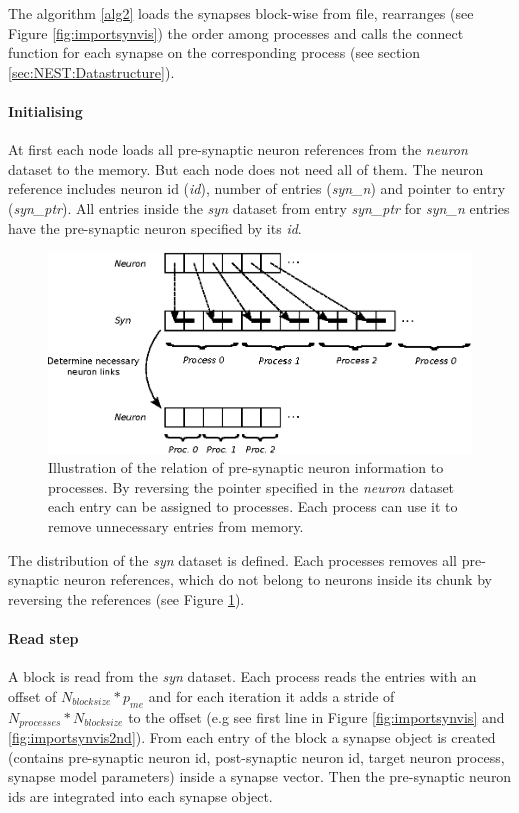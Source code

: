 The algorithm \ref{alg2} loads the synapses block-wise from file, rearranges (see Figure \ref{fig:importsynvis}) the order
among processes and calls the connect function for each synapse on the corresponding process (see section \ref{sec:NEST:Datastructure}).

\newpage
\paragraph{Initialising}
At first each node loads all pre-synaptic neuron references from the \emph{neuron} dataset to the memory.
But each node does not need all of them. 
The neuron reference includes neuron id (\emph{id}), number of entries  (\emph{syn\_n}) and pointer to entry (\emph{syn\_ptr}).
All entries inside the \emph{syn} dataset from  entry \emph{syn\_ptr} for \emph{syn\_n} entries have the pre-synaptic neuron specified by its \emph{id}.
\begin{figure}[ht!]
\centering
\includegraphics[scale=1.0]{pictures/NeuronLinksRemoving.eps}
\caption{Illustration of the relation of pre-synaptic neuron information to processes.
By reversing the pointer specified in the \emph{neuron} dataset
each entry can be assigned to processes.
Each process can use it to remove unnecessary entries from memory.
}
\label{fig:neuonlinksremoving}
\end{figure}
The distribution of the \emph{syn} dataset is defined.
Each processes removes all pre-synaptic neuron references, which do not belong to
neurons inside its chunk by reversing the references (see Figure \ref{fig:neuonlinksremoving}).

\paragraph{Read step}
A block is read from the \emph{syn} dataset.
Each process reads the entries with an offset of $N_{blocksize} * p_{me}$ and
for each iteration it adds a stride of $N_{processes} * N_{blocksize}$  to the offset (e.g see first line in Figure \ref{fig:importsynvis} and \ref{fig:importsynvis2nd}).
From each entry of the block a synapse object is created
(contains pre-synaptic neuron id, post-synaptic neuron id, target neuron process, synapse model parameters)
inside a synapse vector. Then the pre-synaptic neuron ids are integrated into each synapse object.

